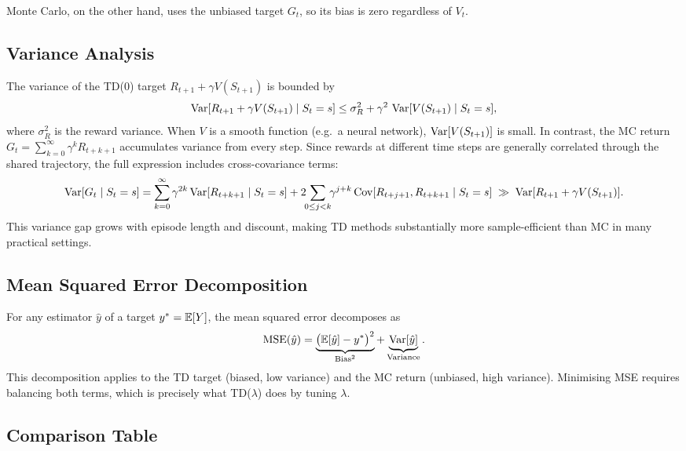 Monte Carlo, on the other hand, uses the unbiased target $G_t$, so its bias is zero regardless of $V_t$.

\subsection{Variance Analysis}

The variance of the TD(0) target $R_{t+1}+\gamma V(S_{t+1})$ is bounded by
\[
\operatorname{Var}[R_{t+1}+\gamma V(S_{t+1})\mid S_t=s] \le \sigma_R^2 + \gamma^2\,\operatorname{Var}[V(S_{t+1})\mid S_t=s],
\]
where $\sigma_R^2$ is the reward variance.  When $V$ is a smooth function (e.g.\ a neural network), $\operatorname{Var}[V(S_{t+1})]$ is small.  In contrast, the MC return $G_t = \sum_{k=0}^{\infty}\gamma^k R_{t+k+1}$ accumulates variance from every step.  Since rewards at different time steps are generally correlated through the shared trajectory, the full expression includes cross-covariance terms:
\[
\operatorname{Var}[G_t\mid S_t=s] = \sum_{k=0}^{\infty}\gamma^{2k}\operatorname{Var}[R_{t+k+1}\mid S_t=s] + 2\!\!\sum_{0\le j<k}\!\!\gamma^{j+k}\operatorname{Cov}[R_{t+j+1},R_{t+k+1}\mid S_t=s] \;\gg\; \operatorname{Var}[R_{t+1}+\gamma V(S_{t+1})].
\]
This variance gap grows with episode length and discount, making TD methods substantially more sample-efficient than MC in many practical settings.

\subsection{Mean Squared Error Decomposition}

For any estimator $\hat y$ of a target $y^* = \operatorname{\mathbb{E}}[Y]$, the mean squared error decomposes as
\begin{equation}
\label{eq:bias-variance-decomp}
\mathrm{MSE}(\hat y) = \underbrace{\bigl(\operatorname{\mathbb{E}}[\hat y] - y^*\bigr)^2}_{\mathrm{Bias}^2} + \underbrace{\operatorname{Var}[\hat y]}_{\mathrm{Variance}}.
\end{equation}
This decomposition applies to the TD target (biased, low variance) and the MC return (unbiased, high variance).  Minimising MSE requires balancing both terms, which is precisely what TD($\lambda$) does by tuning $\lambda$.

\subsection{Comparison Table}

